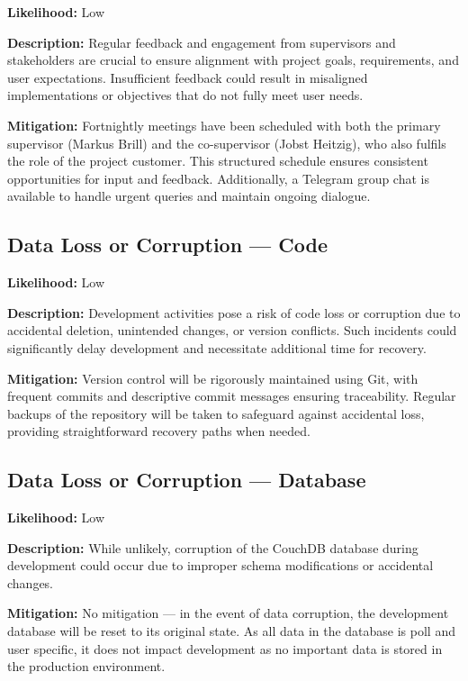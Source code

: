 \textbf{Likelihood:} Low

\textbf{Description:} Regular feedback and engagement from supervisors and stakeholders are crucial to ensure alignment with project goals, requirements, and user expectations. Insufficient feedback could result in misaligned implementations or objectives that do not fully meet user needs.

\textbf{Mitigation:} Fortnightly meetings have been scheduled with both the primary supervisor (Markus Brill) and the co-supervisor (Jobst Heitzig), who also fulfils the role of the project customer. This structured schedule ensures consistent opportunities for input and feedback. Additionally, a Telegram group chat is available to handle urgent queries and maintain ongoing dialogue.

\subsection*{Data Loss or Corruption --- Code}

\textbf{Likelihood:} Low

\textbf{Description:} Development activities pose a risk of code loss or corruption due to accidental deletion, unintended changes, or version conflicts. Such incidents could significantly delay development and necessitate additional time for recovery.

\textbf{Mitigation:} Version control will be rigorously maintained using Git, with frequent commits and descriptive commit messages ensuring traceability. Regular backups of the repository will be taken to safeguard against accidental loss, providing straightforward recovery paths when needed.

\subsection*{Data Loss or Corruption --- Database}

\textbf{Likelihood:} Low

\textbf{Description:} While unlikely, corruption of the CouchDB database during development could occur due to improper schema modifications or accidental changes.

\textbf{Mitigation:} No mitigation --- in the event of data corruption, the development database will be reset to its original state. As all data in the database is poll and user specific, it does not impact development as no important data is stored in the production environment.

